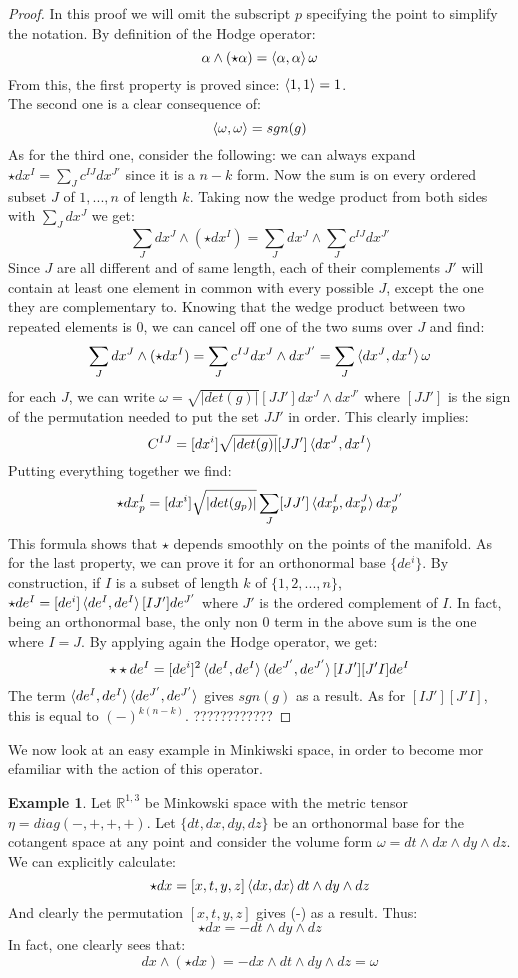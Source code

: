\documentclass[12pt,a4paper]{report}
\theoremstyle{definition}
\theoremstyle{Theorem}
\theoremstyle{definition}
\newtheorem{Ex}[Def]{Example}
\theoremstyle{definition}
\begin{document}
	\begin{proof}
		In this proof we will omit the subscript $p$ specifying the point to simplify the notation. 
		By definition of the Hodge operator:
		$$\alpha\wedge(\star\alpha)=\braket{\alpha,\alpha}\omega$$
		From this, the first property is proved since: $\braket{1,1}=1$.\\
		The second one is a clear consequence of:
		$$\braket{\omega,\omega}=sgn(g)$$
		As for the third one, consider the following: we can always expand $\star dx^I=\sum_Jc^{IJ}dx^{J'}$ since it is a $n-k$ form. Now the sum is on every ordered subset $J$ of ${1,...,n}$ of length $k$. Taking now the wedge product from both sides with $\sum_J dx^J$ we get:
		$$\sum_Jdx^J\wedge(\star dx^I)=\sum_Jdx^J\wedge\sum_Jc^{IJ}dx^{J'}$$
		Since $J$ are all different and of same length, each of their complements $J'$ will contain at least one element in common with every possible $J$, except the one they are complementary to. Knowing that the wedge product between two repeated elements is 0, we can cancel off one of the two sums over $J$ and find:
		$$\sum_Jdx^J\wedge(\star dx^I)=\sum_Jc^{IJ}dx^J\wedge dx^{J'}=\sum_J\braket{dx^J,dx^I}\omega$$
		for each $J$, we can write $\omega=\sqrt{|det(g)|}[JJ']dx^J\wedge dx^{J'}$ where $[JJ']$ is the sign of the permutation needed to put the set $JJ'$ in order. This clearly implies:
		$$C^{IJ}=[dx^i]\sqrt{|det(g)|}[JJ']\braket{dx^J,dx^I}$$
		Putting everything together we find:
		$$\star dx_p^I=[dx^i]\sqrt{|det(g_p)|}\sum_J[JJ']\braket{dx_p^I,dx_p^J}dx_p^{J'}$$
		This formula shows that $\star$ depends smoothly on the points of the manifold.
		As for the last property, we can prove it for an orthonormal base $\{de^i\}$. By construction, if $I$ is a subset of length $k$ of $\{1,2,...,n\}$, $\star de^I=[de^i]\braket{de^I,de^I}[IJ'] de^{J'}$ where $J'$ is the ordered complement of $I$. In fact, being an orthonormal base, the only non 0 term in the above sum is the one where $I=J$. By applying again the Hodge operator, we get:
		$$\star\star de^I=[de^i]^2\braket{de^I,de^I}\braket{de^{J'},de^{J'}}[IJ'][J'I] de^{I}$$
		The term $\braket{de^I,de^I}\braket{de^{J'},de^{J'}}$ gives $sgn(g)$ as a result. As for $[IJ'][J'I]$, this is equal to $(-)^{k(n-k)}$. ????????????
	\end{proof}
	We now look at an easy example in Minkiwski space, in order to become mor efamiliar with the action of this operator.
	\begin{Ex}
		Let $\mathbb{R}^{1,3}$ be Minkowski space with the metric tensor $\eta=diag(-,+,+,+)$. Let $\{dt,dx,dy,dz\}$ be an orthonormal base for the cotangent space at any point and consider the volume form $\omega=dt\wedge dx\wedge dy\wedge dz$. We can explicitly calculate:
		$$\star dx=[x,t,y,z]\braket{dx,dx}dt\wedge dy\wedge dz$$
		And clearly the permutation $[x,t,y,z]$ gives (-) as a result. Thus:
		$$\star dx=-dt\wedge dy\wedge dz$$
		In fact, one clearly sees that:
		$$dx\wedge (\star dx)=-dx\wedge dt\wedge dy\wedge dz=\omega$$
	\end{Ex}
\end{document}
